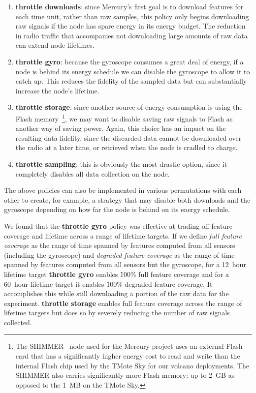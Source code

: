 \begin{enumerate}

\item \textbf{throttle downloads}: since Mercury's first goal is to download
features for each time unit, rather than raw samples, this policy only begins
downloading raw signals if the node has spare energy in its energy budget.
The reduction in radio traffic that accompanies not downloading large amounts
of raw data can extend node lifetimes.

\item \textbf{throttle gyro}: because the gyroscope consumes a great deal of
energy, if a node is behind its energy schedule we can disable the gyroscope
to allow it to catch up. This reduces the fidelity of the sampled data but
can substantially increase the node's lifetime.

\item \textbf{throttle storage}: since another source of energy consumption
is using the Flash memory~\footnote{The SHIMMER~\cite{shimmer} node used for
the Mercury project uses an external Flash card that has a significantly
higher energy cost to read and write than the internal Flash chip used by the
TMote Sky for our volcano deployments. The SHIMMER also carries significantly
more Flash memory: up to 2~GB as opposed to the 1~MB on the TMote Sky.}, we
may want to disable saving raw signals to Flash as another way of saving
power. Again, this choice has an impact on the resulting data fidelity, since
the discarded data cannot be downloaded over the radio at a later time, or
retrieved when the node is cradled to charge.

\item \textbf{throttle sampling}: this is obviously the most drastic option,
since it completely disables all data collection on the node.

\end{enumerate}

The above policies can also be implemented in various permutations with each
other to create, for example, a strategy that may disable both downloads and
the gyroscope depending on how far the node is behind on its energy schedule.

We found that the \textbf{throttle gyro} policy was effective at trading off
feature coverage and lifetime across a range of lifetime targets. If we
define \textit{full feature coverage} as the range of time spanned by
features computed from all sensors (including the gyroscope) and
\textit{degraded feature coverage} as the range of time spanned by features
computed from all sensors but the gyroscope, for a 12~hour lifetime target
\textbf{throttle gyro} enables \~100\% full feature coverage and for a
60~hour lifetime target it enables \~100\% degraded feature coverage. It
accomplishes this while still downloading a portion of the raw data for the
experiment. \textbf{throttle storage} enables full feature coverage across
the range of lifetime targets but does so by severely reducing the number of
raw signals collected.

